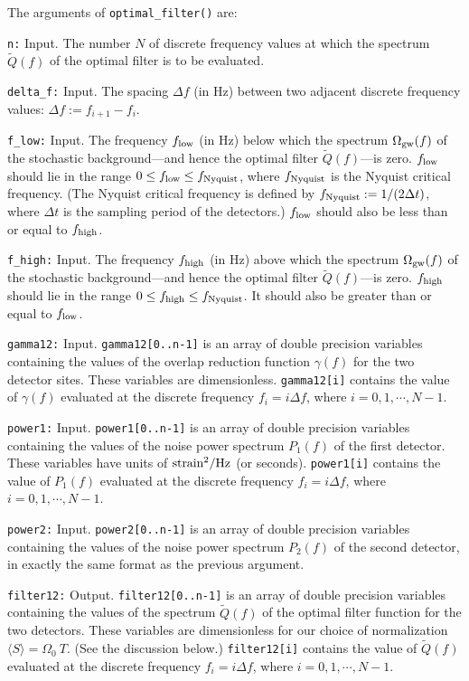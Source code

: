 The arguments of {\tt optimal\_filter()} are:
\begin{description}
%
\item{\tt n:} Input. 
The number $N$ of discrete frequency values at which the spectrum
$\tilde Q(f)$ of the optimal filter is to be evaluated.
%
\item{\tt delta\_f:} Input.
The spacing $\Delta f$ (in Hz) between two adjacent discrete frequency
values: $\Delta f:=f_{i+1}-f_i$.  
%
\item{\tt f\_low:} Input.  
The frequency $f_{\rm low}$ (in Hz) below which the spectrum 
$\Omega_{\rm gw}(f)$ of the stochastic background---and hence the
optimal filter $\tilde Q(f)$---is zero.
$f_{\rm low}$ should lie in the range $0\le f_{\rm low}\le f_{\rm Nyquist}$, 
where $f_{\rm Nyquist}$ is the Nyquist critical frequency. 
(The Nyquist critical frequency is defined by 
$f_{\rm Nyquist}:=1/(2\Delta t)$, 
where $\Delta t$ is the sampling period of the detectors.)
$f_{\rm low}$ should also be less than or equal to $f_{\rm high}$.
%
\item{\tt f\_high:} Input.  
The frequency $f_{\rm high}$ (in Hz) above which the spectrum 
$\Omega_{\rm gw}(f)$ of the stochastic background---and hence the 
optimal filter $\tilde Q(f)$---is zero.
$f_{\rm high}$ should lie in the range $0\le f_{\rm high}\le f_{\rm Nyquist}$.
It should also be greater than or equal to $f_{\rm low}$.
%
\item{\tt gamma12:} Input.  
{\tt gamma12[0..n-1]} is an array of double precision variables 
containing the values of the overlap reduction function $\gamma(f)$ 
for the two detector sites.
These variables are dimensionless.
{\tt gamma12[i]} contains the value of $\gamma(f)$ evaluated at the 
discrete frequency $f_i=i\Delta f$, where $i=0,1,\cdots,N-1$.
%
\item{\tt power1:} Input.  
{\tt power1[0..n-1]} is an array of double precision variables 
containing the values of the noise power spectrum $P_1(f)$ of the 
first detector.
These variables have units of ${\rm strain}^2/{\rm Hz}$ (or seconds).
{\tt power1[i]} contains the value of $P_1(f)$ evaluated at the discrete
frequency $f_i=i\Delta f$, where $i=0,1,\cdots,N-1$.
%
\item{\tt power2:} Input.  
{\tt power2[0..n-1]} is an array of double precision variables 
containing the values of the noise power spectrum $P_2(f)$ of the 
second detector, in exactly the same format as the previous
argument.
%
\item{\tt filter12:} Output.  
{\tt filter12[0..n-1]} is an array of double precision variables 
containing the values of the spectrum $\tilde Q(f)$ of the optimal 
filter function for the two detectors.
These variables are dimensionless for our choice of normalization
$\langle S\rangle =\Omega_0\ T$.
(See the discussion below.)
{\tt filter12[i]} contains the value of $\tilde Q(f)$ evaluated at the 
discrete frequency $f_i=i\Delta f$, where $i=0,1,\cdots,N-1$.
\end{description}

